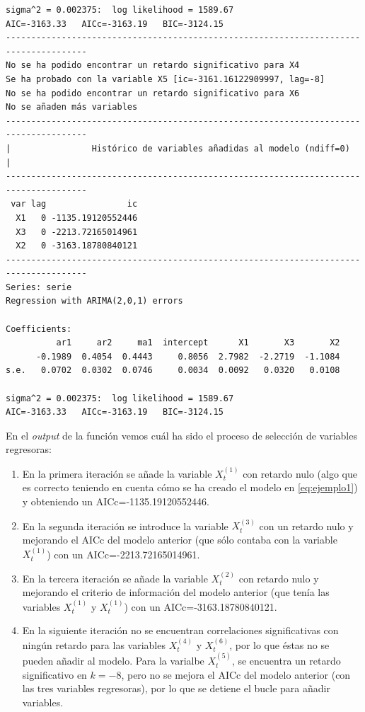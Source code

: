 \documentclass[
  12pt,
  a4paper]{article}
\providecommand{\tightlist}{%
  \setlength{\itemsep}{0pt}\setlength{\parskip}{0pt}}
\begin{document}
\begin{verbatim}
sigma^2 = 0.002375:  log likelihood = 1589.67
AIC=-3163.33   AICc=-3163.19   BIC=-3124.15
--------------------------------------------------------------------------------------
No se ha podido encontrar un retardo significativo para X4
Se ha probado con la variable X5 [ic=-3161.16122909997, lag=-8]
No se ha podido encontrar un retardo significativo para X6
No se añaden más variables
--------------------------------------------------------------------------------------
|                Histórico de variables añadidas al modelo (ndiff=0)                 |
--------------------------------------------------------------------------------------
 var lag                ic
  X1   0 -1135.19120552446
  X3   0 -2213.72165014961
  X2   0 -3163.18780840121
--------------------------------------------------------------------------------------
Series: serie 
Regression with ARIMA(2,0,1) errors 

Coefficients:
          ar1     ar2     ma1  intercept      X1       X3       X2
      -0.1989  0.4054  0.4443     0.8056  2.7982  -2.2719  -1.1084
s.e.   0.0702  0.0302  0.0746     0.0034  0.0092   0.0320   0.0108

sigma^2 = 0.002375:  log likelihood = 1589.67
AIC=-3163.33   AICc=-3163.19   BIC=-3124.15
\end{verbatim}

En el \emph{output} de la función vemos cuál ha sido el proceso de
selección de variables regresoras:

\begin{enumerate}
\def\labelenumi{\arabic{enumi}.}
\tightlist
\item
  En la primera iteración se añade la variable \(X_t^{(1)}\) con retardo
  nulo (algo que es correcto teniendo en cuenta cómo se ha creado el
  modelo en \ref{eq:ejemplo1}) y obteniendo un AICc=-1135.19120552446.
\item
  En la segunda iteración se introduce la variable \(X_t^{(3)}\) con un
  retardo nulo y mejorando el AICc del modelo anterior (que sólo contaba
  con la variable \(X_t^{(1)}\)) con un AICc=-2213.72165014961.
\item
  En la tercera iteración se añade la variable \(X_t^{(2)}\) con retardo
  nulo y mejorando el criterio de información del modelo anterior (que
  tenía las variables \(X_t^{(1)}\) y \(X_t^{(1)}\)) con un
  AICc=-3163.18780840121.
\item
  En la siguiente iteración no se encuentran correlaciones
  significativas con ningún retardo para las variables \(X_t^{(4)}\) y
  \(X_t^{(6)}\), por lo que éstas no se pueden añadir al modelo. Para la
  varialbe \(X_t^{(5)}\), se encuentra un retardo significativo en
  \(k=-8\), pero no se mejora el AICc del modelo anterior (con las tres
  variables regresoras), por lo que se detiene el bucle para añadir
  variables.
\end{enumerate}
\end{document}
